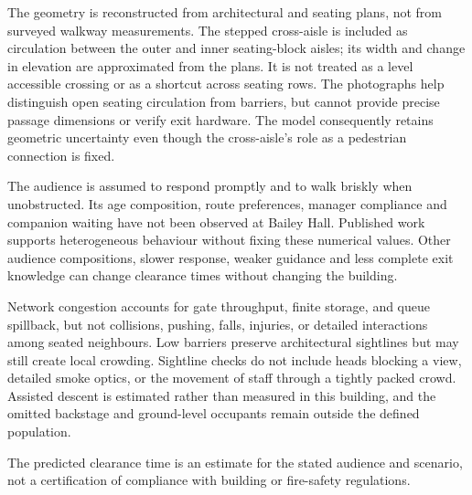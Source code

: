 \documentclass[11pt,a4paper]{article}
\begin{document}
The geometry is reconstructed from architectural and seating plans, not from surveyed walkway measurements. The stepped cross-aisle is included as circulation between the outer and inner seating-block aisles; its width and change in elevation are approximated from the plans. It is not treated as a level accessible crossing or as a shortcut across seating rows. The photographs help distinguish open seating circulation from barriers, but cannot provide precise passage dimensions or verify exit hardware. The model consequently retains geometric uncertainty even though the cross-aisle's role as a pedestrian connection is fixed.

The audience is assumed to respond promptly and to walk briskly when unobstructed. Its age composition, route preferences, manager compliance and companion waiting have not been observed at Bailey Hall. Published work supports heterogeneous behaviour without fixing these numerical values. Other audience compositions, slower response, weaker guidance and less complete exit knowledge can change clearance times without changing the building.

Network congestion accounts for gate throughput, finite storage, and queue spillback, but not collisions, pushing, falls, injuries, or detailed interactions among seated neighbours. Low barriers preserve architectural sightlines but may still create local crowding. Sightline checks do not include heads blocking a view, detailed smoke optics, or the movement of staff through a tightly packed crowd. Assisted descent is estimated rather than measured in this building, and the omitted backstage and ground-level occupants remain outside the defined population.

The predicted clearance time is an estimate for the stated audience and scenario, not a certification of compliance with building or fire-safety regulations.
\end{document}

